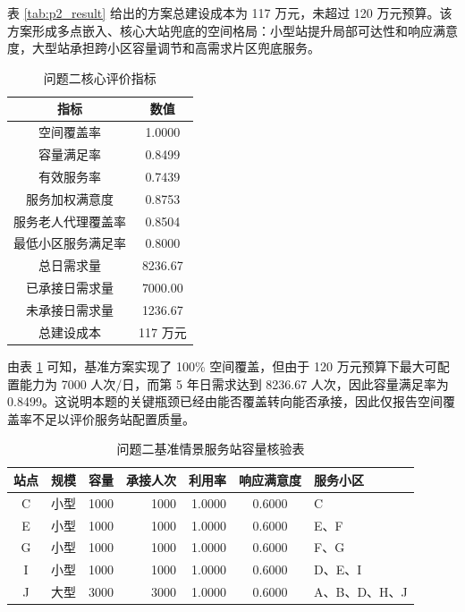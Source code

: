 表 \ref{tab:p2_result} 给出的方案总建设成本为 117 万元，未超过 120 万元预算。该方案形成多点嵌入、核心大站兜底的空间格局：小型站提升局部可达性和响应满意度，大型站承担跨小区容量调节和高需求片区兜底服务。

\begin{table}[H]
\centering
\caption{问题二核心评价指标}
\label{tab:p2_metrics}
\begin{tabular}{c c}
\toprule
指标 & 数值 \\
\midrule
空间覆盖率 & 1.0000 \\
容量满足率 & 0.8499 \\
有效服务率 & 0.7439 \\
服务加权满意度 & 0.8753 \\
服务老人代理覆盖率 & 0.8504 \\
最低小区服务满足率 & 0.8000 \\
总日需求量 & 8236.67 \\
已承接日需求量 & 7000.00 \\
未承接日需求量 & 1236.67 \\
总建设成本 & 117 万元 \\
\bottomrule
\end{tabular}
\end{table}

由表 \ref{tab:p2_metrics} 可知，基准方案实现了 100\% 空间覆盖，但由于 120 万元预算下最大可配置能力为 7000 人次/日，而第 5 年日需求达到 8236.67 人次，因此容量满足率为 0.8499。这说明本题的关键瓶颈已经由能否覆盖转向能否承接，因此仅报告空间覆盖率不足以评价服务站配置质量。

\begin{table}[H]
\centering
\caption{问题二基准情景服务站容量核验表}
\label{tab:p2_station_audit}
\begin{tabular}{c c r r r c p{}}
\toprule
站点 & 规模 & 容量 & 承接人次 & 利用率 & 响应满意度 & 服务小区 \\
\midrule
C & 小型 & 1000 & 1000 & 1.0000 & 0.6000 & C \\
E & 小型 & 1000 & 1000 & 1.0000 & 0.6000 & E、F \\
G & 小型 & 1000 & 1000 & 1.0000 & 0.6000 & F、G \\
I & 小型 & 1000 & 1000 & 1.0000 & 0.6000 & D、E、I \\
J & 大型 & 3000 & 3000 & 1.0000 & 0.6000 & A、B、D、H、J \\
\bottomrule
\end{tabular}
\end{table}

